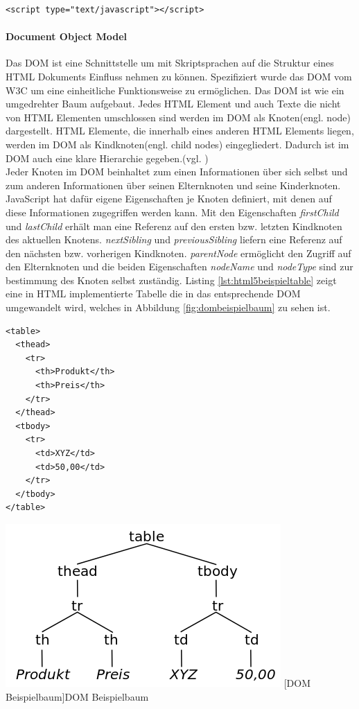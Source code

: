 \documentclass[12pt,a4paper,bibliography=totocnumbered,listof=totocnumbered]{scrartcl}
\begin{document}
	\vspace{1em}
	\begin{lstlisting}[caption=JavaScript Einbindung in \textit{script}-Element, label=lst:jseinbindungscript]
<script type="text/javascript"></script>
	\end{lstlisting}

\paragraph{Document Object Model} Das \ac{DOM} ist eine Schnittstelle um mit Skriptsprachen auf die Struktur eines HTML Dokuments Einfluss nehmen zu können. Spezifiziert wurde das DOM vom W3C um eine einheitliche Funktionsweise zu ermöglichen. Das DOM ist wie ein umgedrehter Baum aufgebaut. Jedes HTML Element und auch Texte die nicht von HTML Elementen umschlossen sind werden im DOM als Knoten(engl. node) dargestellt. HTML Elemente, die innerhalb eines anderen HTML Elements liegen, werden im DOM als Kindknoten(engl. child nodes) eingegliedert. Dadurch ist im DOM auch eine klare Hierarchie gegeben.(vgl. \cite[S.350]{WenzJava2008})\\Jeder Knoten im DOM beinhaltet zum einen Informationen über sich selbst und zum anderen Informationen über seinen Elternknoten und seine Kinderknoten. JavaScript hat dafür eigene Eigenschaften je Knoten definiert, mit denen auf diese Informationen zugegriffen werden kann. Mit den Eigenschaften \textit{firstChild} und \textit{lastChild} erhält man eine Referenz auf den ersten bzw. letzten Kindknoten des aktuellen Knotens. \textit{nextSibling} und \textit{previousSibling} liefern eine Referenz auf den nächsten bzw. vorherigen Kindknoten. \textit{parentNode} ermöglicht den Zugriff auf den Elternknoten und die beiden Eigenschaften \textit{nodeName} und \textit{nodeType} sind zur bestimmung des Knoten selbst zuständig. Listing \ref{lst:html5beispieltable} zeigt eine in HTML implementierte Tabelle die in das entsprechende DOM umgewandelt wird, welches in Abbildung \ref{fig:dombeispielbaum} zu sehen ist.

	\vspace{1em}
	\begin{lstlisting}[caption=DOM5 Beispiel Definition, label=lst:html5beispieltable]
<table>
  <thead>
    <tr>
      <th>Produkt</th>
      <th>Preis</th>
    </tr>
  </thead>
  <tbody>
    <tr>
      <td>XYZ</td>
      <td>50,00</td>
    </tr>
  </tbody>
</table>
	\end{lstlisting}

	\vspace{1em}
	\begin{minipage}{\linewidth}
		\centering
		\includegraphics[width=0.5\linewidth]{images/dom_sampletree.png}
		[DOM Beispielbaum]{DOM Beispielbaum}
		\label{fig:dombeispielbaum}
	\end{minipage}
\end{document}
